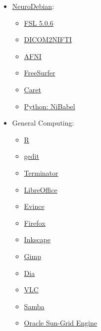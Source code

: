 \documentclass[final,titlepage,letterpaper,oneside,12pt]{article}
\begin{document}
\noindent
\begin{small}
\begin{itemize} \itemsep-2pt
    
    \item{\href{http://neuro.debian.net/}{NeuroDebian}:}
    \begin{itemize} \itemsep-2pt
        \item{\href{http://fsl.fmrib.ox.ac.uk/fsl/fslwiki/}{FSL 5.0.6}}
        \item{\href{http://www.mccauslandcenter.sc.edu/mricro/mricron/dcm2nii.html}{DICOM2NIFTI}}
        \item{\href{http://afni.nimh.nih.gov/afni/}{AFNI}}
        \item{\href{https://surfer.nmr.mgh.harvard.edu/}{FreeSurfer}}
        \item{\href{http://brainvis.wustl.edu/wiki/index.php/Caret:About}{Caret}}
        \item{\href{http://nipy.org/nibabel/}{Python: NiBabel}}
    \end{itemize}
    
    \item{General Computing:}
    \begin{itemize} \itemsep-2pt
        \item{\href{http://cran.r-project.org/}{R}}
        \item{\href{https://wiki.gnome.org/Apps/Gedit}{gedit}}
        \item{\href{https://launchpad.net/terminator}{Terminator}}
        \item{\href{https://www.libreoffice.org/}{LibreOffice}}
        \item{\href{https://wiki.gnome.org/Apps/Evince}{Evince}}
        \item{\href{https://wiki.gnome.org/Apps/Evince}{Firefox}}
        \item{\href{http://www.inkscape.org/en/}{Inkscape}}
        \item{\href{http://www.gimp.org/}{Gimp}}
        \item{\href{https://wiki.gnome.org/Apps/Dia}{Dia}}
        \item{\href{http://www.videolan.org/vlc/index.html}{VLC}}
        \item{\href{https://www.samba.org/}{Samba}}
        \item{\href{http://www.socher.org/index.php/Main/HowToInstallSunGridEngineOnUbuntu}{Oracle Sun-Grid Engine}}
    \end{itemize}
    

\end{itemize}
\end{small}
\end{document}
